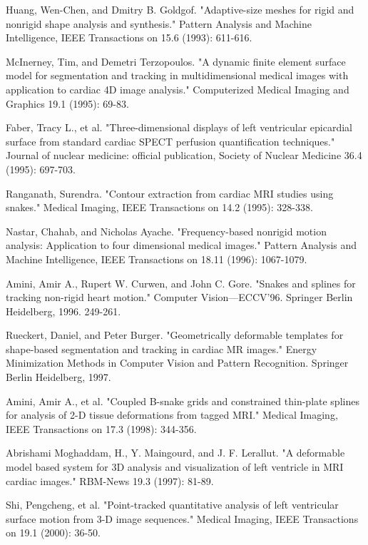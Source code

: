 \documentclass{jicspack}
\begin{document}
\begin{thebibliography}{99}\label{ref:ref}

 Huang, Wen-Chen, and Dmitry B. Goldgof. "Adaptive-size meshes for rigid and nonrigid shape analysis and synthesis." Pattern Analysis and Machine Intelligence, IEEE Transactions on 15.6 (1993): 611-616.

 McInerney, Tim, and Demetri Terzopoulos. "A dynamic finite element surface model for segmentation and tracking in multidimensional medical images with application to cardiac 4D image analysis." Computerized Medical Imaging and Graphics 19.1 (1995): 69-83.

 Faber, Tracy L., et al. "Three-dimensional displays of left ventricular epicardial surface from standard cardiac SPECT perfusion quantification techniques." Journal of nuclear medicine: official publication, Society of Nuclear Medicine 36.4 (1995): 697-703.

 Ranganath, Surendra. "Contour extraction from cardiac MRI studies using snakes." Medical Imaging, IEEE Transactions on 14.2 (1995): 328-338.

 Nastar, Chahab, and Nicholas Ayache. "Frequency-based nonrigid motion analysis: Application to four dimensional medical images." Pattern Analysis and Machine Intelligence, IEEE Transactions on 18.11 (1996): 1067-1079.

 Amini, Amir A., Rupert W. Curwen, and John C. Gore. "Snakes and splines for tracking non-rigid heart motion." Computer Vision—ECCV'96. Springer Berlin Heidelberg, 1996. 249-261.

 Rueckert, Daniel, and Peter Burger. "Geometrically deformable templates for shape-based segmentation and tracking in cardiac MR images." Energy Minimization Methods in Computer Vision and Pattern Recognition. Springer Berlin Heidelberg, 1997.

 Amini, Amir A., et al. "Coupled B-snake grids and constrained thin-plate splines for analysis of 2-D tissue deformations from tagged MRI." Medical Imaging, IEEE Transactions on 17.3 (1998): 344-356.

 Abrishami Moghaddam, H., Y. Maingourd, and J. F. Lerallut. "A deformable model based system for 3D analysis and visualization of left ventricle in MRI cardiac images." RBM-News 19.3 (1997): 81-89. 

 Shi, Pengcheng, et al. "Point-tracked quantitative analysis of left ventricular surface motion from 3-D image sequences." Medical Imaging, IEEE Transactions on 19.1 (2000): 36-50.


\end{thebibliography}
\end{document}
